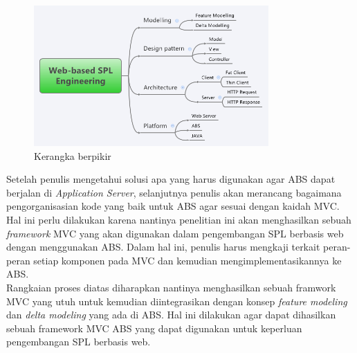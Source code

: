 \begin{figure}
    \centering
    \includegraphics[width=0.8\textwidth]
        {img/kerangka-berpikir.png}
    \caption{Kerangka berpikir}
\end{figure}

\noindent
Setelah penulis mengetahui solusi apa yang harus digunakan agar ABS dapat berjalan di \textit{Application Server}, selanjutnya penulis akan merancang bagaimana pengorganisasian kode yang baik untuk ABS agar sesuai dengan kaidah MVC. Hal ini perlu dilakukan karena nantinya penelitian ini akan menghasilkan sebuah \textit{framework} MVC yang akan digunakan dalam pengembangan SPL berbasis web dengan menggunakan ABS. Dalam hal ini, penulis harus mengkaji terkait peran-peran setiap komponen pada MVC dan kemudian mengimplementasikannya ke ABS. \\

\noindent
Rangkaian proses diatas diharapkan nantinya menghasilkan sebuah framwork MVC yang utuh untuk kemudian diintegrasikan dengan konsep \textit{feature modeling} dan \textit{delta modeling} yang ada di ABS. Hal ini dilakukan agar dapat dihasilkan sebuah framework MVC ABS yang dapat digunakan untuk keperluan pengembangan SPL berbasis web.

